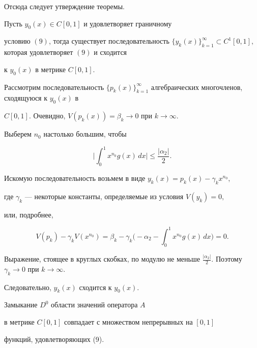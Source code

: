 Отсюда следует утверждение теоремы.





\begin{lem}


Пусть $y_0(x)\in C[0,1]$ и удовлетворяет граничному


условию $(9)$, тогда существует последовательность $\{ y_k (x)\}


_{k=1}^{\infty}\subset C^1[0,1],$ которая удовлетворяет $(9)$ и сходится


к $y_0(x)$ в метрике $C[0,1]$.


\end{lem}





\begin{pf}


Рассмотрим последовательность $\{p_k(x)\}_{k=1}^


{\infty }$ алгебраических многочленов, сходящуюся к $y_0(x)$ в


$C[0,1].$ Очевидно, $V(p_k(x))=\beta _k\to 0$ при $k\to\infty.$


Выберем $n_0$ настолько большим, чтобы


$$


\bigg|\int_0^1x^{n_0}g(x)\,dx\bigg|\le \frac{|\alpha_2|}2.


$$


Искомую последовательность возьмем в виде $y_k(x)=p_k(x)-\gamma _kx^{n_0},$


где $\gamma_k$ --- некоторые константы, определяемые из условия $V(y_k)=0,$


или, подробнее,


$$


V(p_k)-\gamma _kV(x^{n_0})=\beta _k-\gamma _k\bigg(-\alpha _2-\int_0^1


x^{n_0}g(x)\,dx\bigg)=0.


$$


Выражение, стоящее в круглых скобках, по модулю не меньше $\frac


{|\alpha _2|}2.$ Поэтому $\gamma _k\to 0$ при $k\to\infty$.


Следовательно, $y_k(x)$ сходится к $y_0(x).$


\end{pf}





\begin{cornonum}


Замыкание $D^0$ области значений оператора $A$


в метрике $C[0,1]$ совпадает с множеством непрерывных на $[0,1]$


функций, удовлетворяющих (9).


\end{cornonum}





